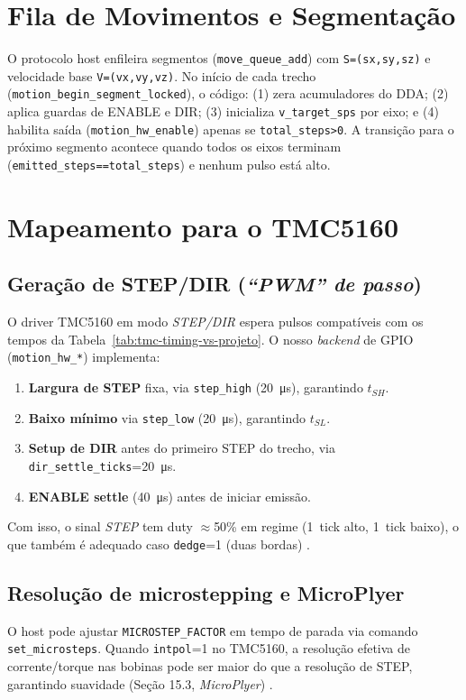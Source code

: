 \FloatBarrier
\section{Fila de Movimentos e Segmenta\c{c}\~ao}
\label{sec:fila}

O protocolo host enfileira segmentos (\texttt{move\_queue\_add}) com \texttt{S=(sx,sy,sz)} e velocidade base \texttt{V=(vx,vy,vz)}.
No in\'icio de cada trecho (\texttt{motion\_begin\_segment\_locked}), o c\'odigo:
(1) zera acumuladores do DDA; (2) aplica guardas de ENABLE e DIR; (3) inicializa \texttt{v\_target\_sps} por eixo; e
(4) habilita sa\'ida (\texttt{motion\_hw\_enable}) apenas se \texttt{total\_steps>0}.
A transi\c{c}\~ao para o pr\'oximo segmento acontece quando todos os eixos terminam (\texttt{emitted\_steps==total\_steps}) e nenhum pulso est\'a alto.

\FloatBarrier
\section{Mapeamento para o TMC5160}
\label{sec:tmc-mapeamento}

\subsection{Gera\c{c}\~ao de STEP/DIR (\emph{``PWM'' de passo})}
O driver TMC5160 em modo \emph{STEP/DIR} espera pulsos compat\'iveis com os tempos da Tabela~\ref{tab:tmc-timing-vs-projeto}. O nosso \emph{backend} de GPIO (\texttt{motion\_hw\_*}) implementa:
\begin{enumerate}
  \item \textbf{Largura de STEP} fixa, via \texttt{step\_high} (\SI{20}{\micro s}), garantindo $t_{SH}$.
  \item \textbf{Baixo m\'inimo} via \texttt{step\_low} (\SI{20}{\micro s}), garantindo $t_{SL}$.
  \item \textbf{Setup de DIR} antes do primeiro STEP do trecho, via \texttt{dir\_settle\_ticks}=\SI{20}{\micro s}.
  \item \textbf{ENABLE settle} (\SI{40}{\micro s}) antes de iniciar emiss\~ao.
\end{enumerate}
Com isso, o sinal \emph{STEP} tem duty $\approx$50\% em regime (1~tick alto, 1~tick baixo), o que tamb\'em \'e adequado caso \texttt{dedge}=1 (duas bordas) \cite{tmc5160_ds}.

\subsection{Resolu\c{c}\~ao de microstepping e MicroPlyer}
O host pode ajustar \texttt{MICROSTEP\_FACTOR} em tempo de parada via comando \texttt{set\_microsteps}. Quando \texttt{intpol}=1 no TMC5160, a resolu\c{c}\~ao efetiva de corrente/torque nas bobinas pode ser maior do que a resolu\c{c}\~ao de STEP, garantindo suavidade (Se\c{c}\~ao 15.3, \emph{MicroPlyer}) \cite{tmc5160_ds}.

